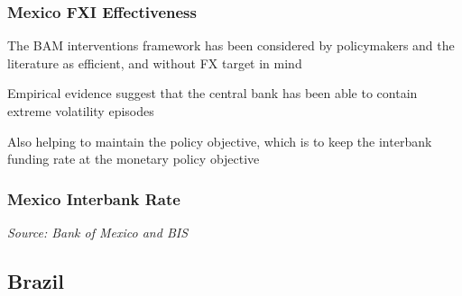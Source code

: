 \documentclass{beamer}
\newenvironment{wideitemize}{\itemize\addtolength{\itemsep}{10pt}}{\enditemize}
\begin{document}
\begin{frame}
  \frametitle{Mexico FXI Effectiveness}
  \begin{wideitemize}
    \item The BAM interventions framework has been considered by policymakers and the literature as efficient, and without FX target in mind
    \item Empirical evidence suggest that the central bank has been able to contain extreme volatility episodes
    \item Also helping to maintain the policy objective, which is to keep the interbank funding rate at the monetary policy objective

  \end{wideitemize}
\end{frame}

\begin{frame}
  \frametitle{Mexico Interbank Rate}
  \medskip
  \emph{Source: Bank of Mexico and BIS \href{https://www.bis.org/publ/bppdf/bispap104p.pdf}{}}

\end{frame}



\subsection{Brazil}
\end{document}

